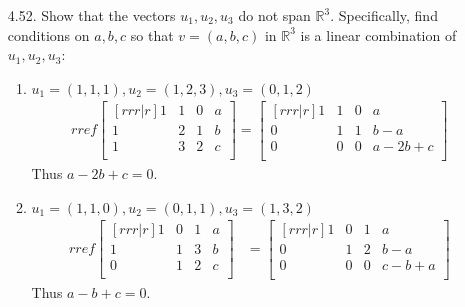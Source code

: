 \documentclass[12pt]{article}
\begin{document}
\begin{enumerate}
\begin{enumerate}
	\end{enumerate}
	
\item[4.52.] Show that the vectors $u_1,u_2,u_3$ do not span $\mathbb{R}^3$. Specifically, find conditions on $a,b,c$ so that $v=(a,b,c)$ in $\mathbb{R}^3$ is a linear combination of $u_1,u_2,u_3$:
	\begin{enumerate}
	\item $u_1=(1,1,1),u_2=(1,2,3),u_3=(0,1,2)$
	\begin{align*}
	rref\begin{bmatrix}[rrr|r] 1&1&0&a\\1&2&1&b\\1&3&2&c\\ \end{bmatrix}
	= \begin{bmatrix}[rrr|r] 1&1&0&a\\0&1&1&b-a\\0&0&0&a-2b+c\\ \end{bmatrix}
	\end{align*}
	Thus $a-2b+c=0$.
	
	\item $u_1=(1,1,0),u_2=(0,1,1),u_3=(1,3,2)$
	\begin{align*}
	rref\begin{bmatrix}[rrr|r] 1&0&1&a\\1&1&3&b\\0&1&2&c\\ \end{bmatrix}
	&= \begin{bmatrix}[rrr|r] 1&0&1&a\\0&1&2&b-a\\0&0&0&c-b+a\\ \end{bmatrix}	
	\end{align*}
	Thus $a-b+c=0$.
	\end{enumerate}


\end{enumerate}
\end{document}
